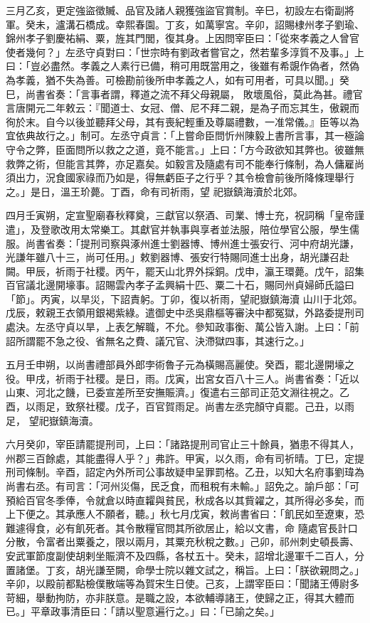 \begin{pinyinscope}
 三月乙亥，更定強盜徵贓、品官及諸人親獲強盜官賞制。辛巳，初設左右衛副將軍。癸未，瀘溝石橋成。幸熙春園。丁亥，如萬寧宮。辛卯，詔賜棣州孝子劉瑜、錦州孝子劉慶祐絹、粟，旌其門閭，復其身。上因問宰臣曰：「從來孝義之人曾官使者幾何？」左丞守貞對曰：「世宗時有劉政者嘗官之，然若輩多淳質不及事。」上曰：「豈必盡然。孝義之人素行已備，稍可用既當用之，後雖有希覬作偽者，然偽為孝義，猶不失為善。可檢勘前後所申孝義之人，如有可用者，可具以聞。」癸巳，尚書省奏：「言事者謂，釋道之流不拜父母親屬，
 敗壞風俗，莫此為甚。禮官言唐開元二年敕云：『聞道士、女冠、僧、尼不拜二親，是為子而忘其生，傲親而徇於末。自今以後並聽拜父母，其有喪紀輕重及尊屬禮數，一准常儀。』臣等以為宜依典故行之。」制可。左丞守貞言：「上嘗命臣問忻州陳毅上書所言事，其一極論守令之弊，臣面問所以救之之道，竟不能言。」上曰：「方今政欲知其弊也。彼雖無救弊之術，但能言其弊，亦足嘉矣。如毅言及隨處有司不能奉行條制，為人傭雇尚須出力，況食國家祿而乃如是，得無虧臣子之行乎？其令檢會前後所降條理舉行之。」是日，溫王玠薨。丁酉，命有司祈雨，望
 祀嶽鎮海瀆於北郊。



 四月壬寅朔，定宣聖廟春秋釋奠，三獻官以祭酒、司業、博士充，祝詞稱「皇帝謹遣」，及登歌改用太常樂工。其獻官并執事與享者並法服，陪位學官公服，學生儒服。尚書省奏：「提刑司察與涿州進士劉器博、博州進士張安行、河中府胡光謙，光謙年雖八十三，尚可任用。」敕劉器博、張安行特賜同進士出身，胡光謙召赴闕。甲辰，祈雨于社稷。丙午，罷天山北界外採銅。戊申，瀛王環薨。戊午，詔集百官議北邊開壕事。詔賜雲內孝子孟興絹十匹、粟二十石，賜同州貞婦師氏謚曰「節」。丙寅，以旱災，下詔責躬。丁卯，復以祈雨，望祀嶽鎮海瀆
 山川于北郊。戊辰，敕親王衣領用銀褐紫綠。遣御史中丞吳鼎樞等審決中都冤獄，外路委提刑司處決。左丞守貞以旱，上表乞解職，不允。參知政事衡、萬公皆入謝。上曰：「前詔所謂罷不急之役、省無名之費、議冗官、決滯獄四事，其速行之。」



 五月壬申朔，以尚書禮部員外郎孛術魯子元為橫賜高麗使。癸酉，罷北邊開壕之役。甲戌，祈雨于社稷。是日，雨。戊寅，出宮女百八十三人。尚書省奏：「近以山東、河北之饑，已委宣差所至安撫賑濟。」復遣右三部司正范文淵往視之。乙酉，以雨足，致祭社稷。戊子，百官賀雨足。尚書左丞完顏守貞罷。己丑，以雨足，
 望祀嶽鎮海瀆。



 六月癸卯，宰臣請罷提刑司，上曰：「諸路提刑司官止三十餘員，猶患不得其人，州郡三百餘處，其能盡得人乎？」弗許。甲寅，以久雨，命有司祈晴。丁巳，定提刑司條制。辛酉，詔定內外所司公事故疑申呈罪罰格。乙丑，以知大名府事劉瑋為尚書右丞。有司言：「河州災傷，民乏食，而租稅有未輸。」詔免之。諭戶部：「可預給百官冬季俸，令就倉以時直糶與貧民，秋成各以其貲糴之，其所得必多矣，而上下便之。其承應人不願者，聽。」秋七月戊寅，敕尚書省曰：「飢民如至遼東，恐難遽得食，必有飢死者。其令散糧官問其所欲居止，給以文書，命
 隨處官長計口分散，令富者出粟養之，限以兩月，其粟充秋稅之數。」己卯，祁州刺史頓長壽、安武軍節度副使胡剌坐賑濟不及四縣，各杖五十。癸未，詔增北邊軍千二百人，分置諸堡。丁亥，胡光謙至闕，命學士院以雜文試之，稱旨。上曰：「朕欲親問之。」辛卯，以殿前都點檢僕散端等為賀宋生日使。己亥，上謂宰臣曰：「聞諸王傅尉多苛細，舉動拘防，亦非朕意。是職之設，本欲輔導諸王，使歸之正，得其大體而已。」平章政事清臣曰：「請以聖意遍行之。」曰：「已諭之矣。」




\end{pinyinscope}
